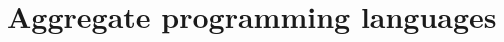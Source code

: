 \documentclass[12pt,a4paper,twoside,openright]{book}
\begin{document}
\section{Aggregate programming languages}






% 
% 
\end{document}
